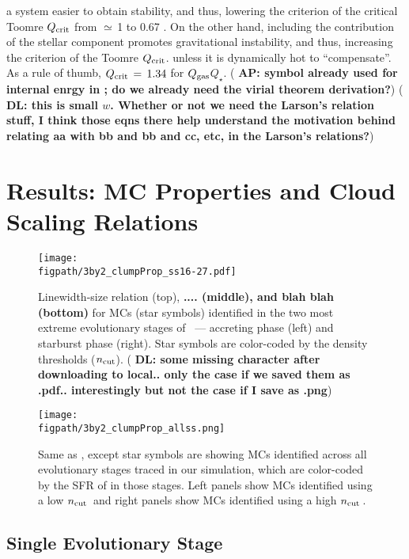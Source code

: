 \IfFileExists{emulateapjlegacy.cls}{\documentclass[iop]{emulateapjlegacy}}{\documentclass[iop]{emulateapj}}
\newcommand{\AP}[1]{({\bf \color{apcolor} AP: #1})}
\newcommand{\DL}[1]{({\bf \color{dlcolor} DL: #1})}
\def\figpath{./Fig}
\begin{document}
a system easier to obtain stability, and thus, lowering the criterion of the critical Toomre 
$Q_{\rm crit}$ from $\simeq$\,1 to 
0.67 \citep{Goldreich65a}. On the other hand, including the contribution of the stellar 
component promotes gravitational instability, and thus, increasing the criterion of the Toomre $Q_{\rm crit}$.
unless it is dynamically hot to ``compensate''.  
As a rule of thumb, $Q_{\rm crit}\,=\,1.34$ for $Q_{\rm gas}$\eq$Q_\star$.  %
\AP{symbol already used for internal enrgy in \Eq{virial_th_general}; do we already need the virial theorem derivation?}
\DL{this is small $w$. Whether or not we need the Larson's relation stuff, I think those eqns there help understand the motivation
behind relating aa with bb and bb and cc, etc, in the Larson's relations?}

\section{Results: MC Properties and Cloud Scaling Relations}\label{sec:results}

\begin{figure*}
\centering
\texttt{[image: \\figpath/3by2\_clumpProp\_ss16-27.pdf]}
\caption{
Linewidth-size relation (top),
{\bf .... (middle), and blah blah (bottom)}
for MCs (star symbols)
identified in the two most extreme evolutionary stages of \flower\ --- accreting phase (left) and starburst phase (right).
Star symbols are color-coded by the density thresholds ($n_{\rm cut}$). \DL{some missing character after downloading 
to local.. only the case if we saved them as .pdf.. interestingly but not the case if I save as .png}
\label{fig:larsons_single}}
\end{figure*}

\begin{figure*}
\centering
\texttt{[image: \\figpath/3by2\_clumpProp\_allss.png]}
\caption{
Same as , except star symbols are showing MCs identified across all evolutionary 
stages traced in our simulation, which are color-coded by the SFR of \flower in those stages. 
Left panels show MCs identified using a low $n_{\rm cut}$\,\cc
and right panels show MCs identified using a high $n_{\rm cut}$\,\cc.
\label{fig:alpha16-28}}
\end{figure*}

\subsection{Single Evolutionary Stage}  \label{sec:singless}
\end{document}
